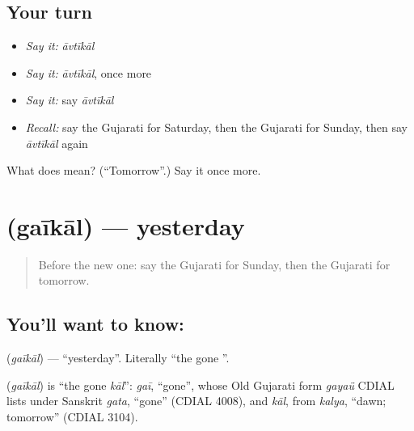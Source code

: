 \subsection*{Your turn}
\begin{itemize}
\raggedright
  \item \emph{Say it:} \emph{āvtīkāl}
  \item \emph{Say it:} \emph{āvtīkāl}, once more
  \item \emph{Say it:} say \emph{āvtīkāl}
  \item \emph{Recall:} say the Gujarati for Saturday, then the Gujarati for Sunday, then say \emph{āvtīkāl} again
\end{itemize}

\begin{tcolorbox}[breakable,colback=teal!4,colframe=teal!35!black,title={Before you move on}]
What does  mean? (\textquotedblleft{}Tomorrow\textquotedblright{}.) Say it once more.
\end{tcolorbox}
\section[\texorpdfstring{\gu{ગઈકાલ} (gaīkāl)}{ગઈકાલ (gaīkāl)}]{ (gaīkāl) — yesterday}

\label{lesson:GU-C79-yesterday}



\begin{quote}
Before the new one: say the Gujarati for Sunday, then the Gujarati for tomorrow.
\end{quote}

\subsection*{You'll want to know: }
\textbf{} (\emph{gaīkāl}) — \textquotedblleft{}yesterday\textquotedblright{}. Literally \textquotedblleft{}the gone \textbf{}\textquotedblright{}.

\begin{cousinweb}
\textbf{} (\emph{gaīkāl}) is \textquotedblleft{}the gone \emph{kāl}\textquotedblright{}: \emph{gaī}, \textquotedblleft{}gone\textquotedblright{}, whose Old Gujarati form \emph{gayaü} CDIAL lists under Sanskrit \emph{gata}, \textquotedblleft{}gone\textquotedblright{} (CDIAL 4008), and \emph{kāl}, from \emph{kalya}, \textquotedblleft{}dawn; tomorrow\textquotedblright{} (CDIAL 3104).
\end{cousinweb}

